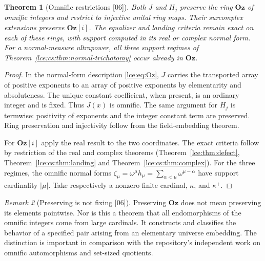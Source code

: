 \documentclass[11pt,letterpaper]{article}
\numberwithin{equation}{section}
\newtheorem{theorem}{Theorem}[section]
\theoremstyle{definition}
\theoremstyle{remark}
\newtheorem{remark}[theorem]{Remark}
\newcommand{\Oz}{\mathbf{Oz}}
\newcommand{\abs}[1]{\lvert#1\rvert}
\newcommand{\thref}[1]{Theorem~\ref{#1}}
\newcommand{\src}[1]{\textup{\textsf{\small[#1]}}}%
\begin{document}
\begin{theorem}[Omnific restrictions \src{06}]\label{lce:cs:thm:integer-lifts}
Both $J$ and $H_j$ preserve the ring $\Oz$ of omnific integers and restrict
to injective unital ring maps. Their surcomplex extensions preserve
$\Oz[i]$. The equalizer and landing criteria remain exact on each of these
rings, with support computed in its real or complex normal form. For a
normal-measure ultrapower, all three support regimes of
\thref{lce:cs:thm:normal-trichotomy} occur already in $\Oz$.
\end{theorem}
\begin{proof}
In the normal-form description \eqref{lce:eq:Oz}, $J$ carries the
transported array of positive exponents to an array of positive exponents
by elementarity and absoluteness. The unique constant coefficient, when
present, is an ordinary integer and is fixed. Thus $J(x)$ is omnific. The
same argument for $H_j$ is termwise: positivity of exponents and the integer
constant term are preserved. Ring preservation and injectivity follow from
the field-embedding theorem.

For $\Oz[i]$ apply the real result to the two coordinates. The exact
criteria follow by restriction of the real and complex theorems
(\thref{lce:thm:defect}, \thref{lce:cs:thm:landing} and
\thref{lce:cs:thm:complex}). For the three regimes, the omnific normal forms
$\zeta_\mu=\omega^\mu h_\mu=\sum_{\alpha<\mu}\omega^{\mu-\alpha}$ have
support cardinality $\abs\mu$. Take respectively a nonzero finite cardinal,
$\kappa$, and $\kappa^+$.
\end{proof}

\begin{remark}[Preserving is not fixing \src{06}]
Preserving $\Oz$ does not mean preserving its elements pointwise. Nor is
this a theorem that all endomorphisms of the omnific integers come from
large cardinals. It constructs and classifies the behavior of a specified
pair arising from an elementary universe embedding. The distinction is
important in comparison with the repository's independent work on omnific
automorphisms and set-sized quotients.
\end{remark}
\end{document}
